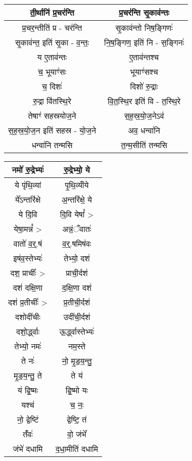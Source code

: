 {\begin{longtable}{|c|c|}
ती॒र्थानि॑ प्र॒चर॑न्ति               & प्र॒चर॑न्ति सृ॒काव॑न्तः\\
\hline
प्र॒चर॒न्तीति॑ प्र - चर॑न्ति          & सृ॒काव॑न्तो निष॒ङ्गिणः॑\\
\hline
सृ॒काव॑न्त॒ इति॑ सृ॒का - व॒न्तः॒         & नि॒ष॒ङ्गिण॒ इति॑ नि - स॒ङ्गिनः॑\\
\hline
य ए॒ताव॑न्तः                     & ए॒ताव॑न्तश्च\\
\hline
च॒ भूयाꣳ॑सः                      & भूयाꣳ॑सश्च\\
\hline
च॒ दिशः॑                        & दिशो॑ रु॒द्राः\\
\hline
रु॒द्रा वि॑तस्थि॒रे                  & वि॒त॒स्थि॒र इति॑ वि - त॒स्थि॒रे\\
\hline
तेषाꣳ॑ सहस्रयोज॒ने                 & स॒ह॒स्र॒यो॒ज॒नेऽव॑\\
\hline
स॒ह॒स्र॒यो॒ज॒न इति॑ सहस्र - यो॒ज॒ने      & अव॒ धन्वा॑नि\\
\hline
धन्वा॑नि तन्मसि                  & त॒न्म॒सीति॑ तन्मसि\\
\hline
\end{longtable}
}
{\centering
\begin{longtable}{|c|c|}
\hline
नमो॑ रु॒द्रेभ्यः॑                    & रु॒द्रेभ्यो॒ ये\\
\hline
ये पृ॑थि॒व्यां                      & पृ॒थि॒व्यांँये\\
\hline
ये᳚ऽन्तरि॑क्षे                      & अ॒न्तरि॑क्षे॒ ये\\
\hline
ये दि॒वि                        & दि॒वि येषां᳚ >\\
\hline
येषा॒मन्नं᳚ >                      & अन्नं॒ँवातः॑\\
\hline
वातो॑ व॒र्॒.षं                     & व॒र्॒.षमिष॑वः\\
\hline
इष॑व॒स्तेभ्यः॑                      & तेभ्यो॒ दश॑\\
\hline
दश॒ प्राचीः᳚ >                   & प्राची॒र्दश॑\\
\hline
दश॑ दक्षि॒णा                     & द॒क्षि॒णा दश॑\\
\hline
दश॑ प्र॒तीचीः᳚ >                  & प्र॒तीची॒र्दश॑\\
\hline
दशोदी॑चीः                      & उदी॑ची॒र्दश॑\\
\hline
दशो॒र्द्ध्वाः                     & ऊ॒र्द्ध्वास्तेभ्यः॑\\
\hline
तेभ्यो॒ नमः॑                      & नम॒स्ते\\
\hline
ते नः॑                          & नो॒ मृ॒ड॒य॒न्तु॒\\
\hline
मृ॒ड॒य॒न्तु॒ ते                       & ते यं\\
\hline
यं द्वि॒ष्मः                      & द्वि॒ष्मो यः\\
\hline
यश्च॑                           & च॒ नः॒\\
\hline
नो॒ द्वेष्टि॑                      & द्वेष्टि॒ तं\\
\hline
तंँवः॑                           & वो॒ जंभे᳚\\
\hline
जंभे॑ दधामि                      & द॒धा॒मीति॑ दधामि\\
\hline
\end{longtable}
}
